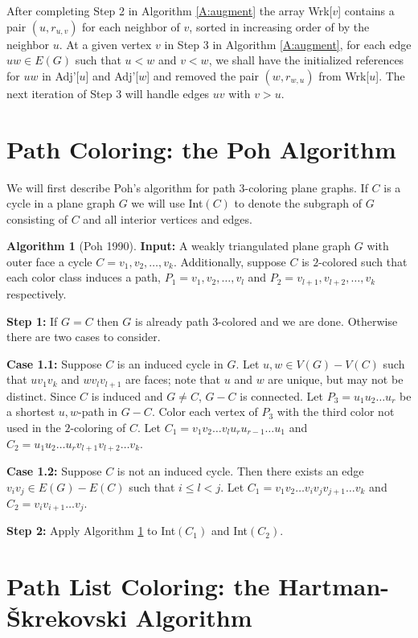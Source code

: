 \documentclass[12pt,letterpaper]{article}
\theoremstyle{plain}
\theoremstyle{definition}
\theoremstyle{break}
\newtheorem{algorithm}[lemma]{Algorithm}     %
\begin{document}
After completing Step 2 in Algorithm \ref{A:augment} the array Wrk[$v$] contains
a pair $(u,r_{u,v})$ for each neighbor of $v$, sorted in increasing order of by
the neighbor $u$. At a given vertex $v$ in Step 3 in Algorithm \ref{A:augment},
for each edge $uw\in E(G)$ such that
$u<w$ and $v<w$, we shall have the initialized references for $uw$ in Adj'[$u$]
and Adj'[$w$] and removed the pair $(w,r_{w,u})$ from Wrk[$u$]. The next
iteration of Step 3 will handle edges $uv$ with $v>u$.

\section{Path Coloring: the Poh Algorithm}

We will first describe Poh's algorithm for path $3$-coloring plane graphs.
If $C$ is a cycle in a plane graph $G$ we will use Int$(C)$ to denote
the subgraph of $G$ consisting of $C$ and all interior vertices and edges.

\begin{algorithm}[Poh 1990] \label{A:planar3}
\textbf{Input:} A weakly triangulated plane graph $G$ with outer face a
cycle $C=v_1,v_2,\ldots, v_k$. Additionally, suppose $C$ is $2$-colored such
that each color class induces a path, $P_1=v_1,v_2,\ldots, v_l$ and
$P_2=v_{l+1},v_{l+2},\ldots, v_k$ respectively.

\textbf{Step 1:} If $G=C$ then $G$ is already path $3$-colored and we
are done. Otherwise there are two cases to consider.

\textbf{Case 1.1:} Suppose $C$ is an induced cycle in $G$. Let
$u,w\in V(G)-V(C)$ such that $uv_1v_k$ and $wv_lv_{l+1}$ are faces; note that
$u$ and $w$ are unique, but may not be distinct. Since $C$ is induced and
$G\ne C$, $G-C$ is connected.
Let $P_3=u_1u_2\ldots u_r$ be a shortest $u,w$-path in $G-C$.
Color each vertex of $P_3$ with the third color not used in the $2$-coloring of
$C$. Let $C_1=v_1v_2\ldots v_lu_ru_{r-1}\ldots u_1$ and
$C_2=u_1u_2\ldots u_rv_{l+1}v_{l+2}\ldots v_k$.

\textbf{Case 1.2:} Suppose $C$ is not an induced cycle. Then there
exists an edge $v_iv_j\in E(G)-E(C)$ such that $i\le l < j$. Let
$C_1=v_1v_2\ldots v_iv_jv_{j+1}\ldots v_k$
and $C_2=v_iv_{i+1}\ldots v_j$.

\textbf{Step 2:} Apply Algorithm \ref{A:planar3} to
Int$(C_1)$ and Int$(C_2)$.
\end{algorithm}

\section{Path List Coloring: the Hartman-\v{S}krekovski Algorithm}
\end{document}
